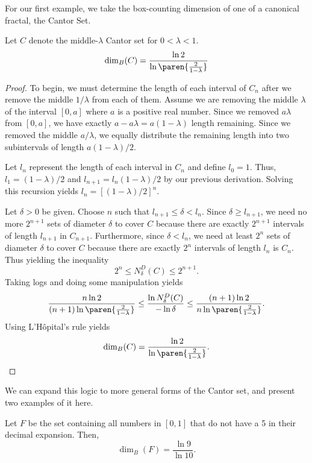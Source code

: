 For our first example, we take the box-counting dimension of one of a canonical fractal, the Cantor Set.

\begin{example}
	Let $C$ denote the middle-$\lambda$ Cantor set for $0<\lambda < 1$.
	\[
		\dim_B(C)=\frac{\ln2}{\ln\paren{\frac{2}{1-\lambda}}}
	\]
\end{example}
\begin{proof}
	To begin, we must determine the length of each interval of $C_n$ after we remove the middle $1/\lambda$ from each of them.
	Assume we are removing the middle $\lambda$ of the interval $[0,a]$ where $a$ is a positive real number.
	Since we removed $a\lambda$ from $[0,a]$, we have exactly $a-a\lambda=a(1-\lambda)$ length remaining.
	Since we removed the middle $a/\lambda$, we equally distribute the remaining length into two subintervals of length $a(1-\lambda)/2$.

	Let $l_n$ represent the length of each interval in $C_n$ and define $l_0=1$.
	Thus, $l_1=(1-\lambda)/2$ and $l_{n+1}=l_n(1-\lambda)/2$ by our previous derivation.
	Solving this recursion yields $l_n={[{(1-\lambda)}/2]}^n$.

	Let $\delta>0$ be given.
	Choose $n$ such that $l_{n+1}\leq\delta< l_n$.
	Since $\delta \geq l_{n+1}$, we need no more $2^{n+1}$ sets of diameter $\delta$ to cover $C$ because there are exactly $2^{n+1}$ intervals of length $l_{n+1}$ in $C_{n+1}$.
	Furthermore, since $\delta < l_n$, we need at least $2^n$ sets of diameter $\delta$ to cover $C$ because there are exactly $2^n$ intervals of length $l_n$ is $C_n$.
	Thus yielding the inequality
	\[
	2^n \leq N^D_\delta(C) \leq 2^{n+1}.
	\]
	Taking logs and doing some manipulation yields
	\[
		\frac{n\ln2}{(n+1)\ln \paren{\frac{2}{1-\lambda}}}\leq\frac{\ln N^D_\delta(C)}{-\ln\delta}\leq\frac{(n+1)\ln2}{n\ln \paren{\frac{2}{1-\lambda}}}.
	\]
	Using L'H\^{o}pital's rule yields
	\[
		\dim_B(C)=\frac{\ln2}{\ln\paren{\frac{2}{1-\lambda}}}.
	\]
\end{proof}

We can expand this logic to more general forms of the Cantor set, and present two examples of it here.

\begin{example}
	Let $F$ be the set containing all numbers in $[0,1]$ that do not have a 5 in their decimal expansion.
	Then,
	\[
		\dim_B(F)=\frac{\ln9}{\ln10}.
	\]
\end{example}

